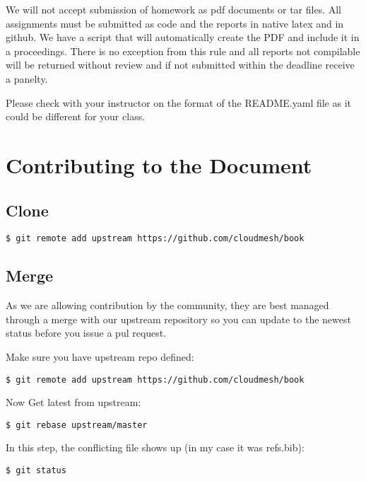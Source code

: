 We will not accept submission of homework as pdf documents or tar
files. All assignments must be submitted as code and the reports in
native latex and in github. We have a script that will automatically
create the PDF and include it in a proceedings. There is no exception
from this rule and all reports not compilable will be returned without
review and if not submitted within the deadline receive a panelty.

Please check with your instructor on the format of the README.yaml
file as it could be different for your class. 

\section{Contributing to the Document}



\subsection{Clone}

\begin{verbatim}
$ git remote add upstream https://github.com/cloudmesh/book
\end{verbatim}


\subsection{Merge}

As we are allowing contribution by the community, they are best managed
through a merge with our upstream repository so you can update to the
newest status before you issue a pul request.

Make sure you have upstream repo defined:

\begin{verbatim}
$ git remote add upstream https://github.com/cloudmesh/book
\end{verbatim}

Now Get latest from upstream:

\begin{verbatim}
$ git rebase upstream/master
\end{verbatim}

In this step, the conflicting file shows up (in my case it was
refs.bib):

\begin{verbatim}
$ git status
\end{verbatim}

